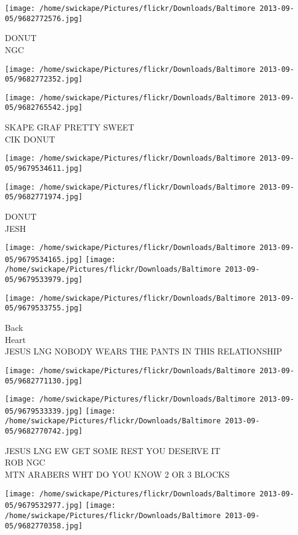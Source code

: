 \documentclass[10pt,letterpaper]{article}
\begin{document}
\vspace{0.25in}
\texttt{[image: /home/swickape/Pictures/flickr/Downloads/Baltimore 2013-09-05/9682772576.jpg]}

DONUT\\
NGC
\pagebreak

\texttt{[image: /home/swickape/Pictures/flickr/Downloads/Baltimore 2013-09-05/9682772352.jpg]}

\vspace{0.25in}
\texttt{[image: /home/swickape/Pictures/flickr/Downloads/Baltimore 2013-09-05/9682765542.jpg]}

SKAPE GRAF PRETTY SWEET\\
CIK DONUT
\pagebreak

\texttt{[image: /home/swickape/Pictures/flickr/Downloads/Baltimore 2013-09-05/9679534611.jpg]}

\vspace{0.25in}
\texttt{[image: /home/swickape/Pictures/flickr/Downloads/Baltimore 2013-09-05/9682771974.jpg]}

DONUT\\
JESH
\pagebreak

\texttt{[image: /home/swickape/Pictures/flickr/Downloads/Baltimore 2013-09-05/9679534165.jpg]}
\texttt{[image: /home/swickape/Pictures/flickr/Downloads/Baltimore 2013-09-05/9679533979.jpg]}

\texttt{[image: /home/swickape/Pictures/flickr/Downloads/Baltimore 2013-09-05/9679533755.jpg]}

Back\\
Heart\\
JESUS LNG NOBODY WEARS THE PANTS IN THIS RELATIONSHIP
\pagebreak

\texttt{[image: /home/swickape/Pictures/flickr/Downloads/Baltimore 2013-09-05/9682771130.jpg]}

\vspace{0.25in}
\texttt{[image: /home/swickape/Pictures/flickr/Downloads/Baltimore 2013-09-05/9679533339.jpg]}
\texttt{[image: /home/swickape/Pictures/flickr/Downloads/Baltimore 2013-09-05/9682770742.jpg]}

JESUS LNG EW GET SOME REST YOU DESERVE IT\\
ROB NGC\\
MTN ARABERS WHT DO YOU KNOW 2 OR 3 BLOCKS
\pagebreak

\texttt{[image: /home/swickape/Pictures/flickr/Downloads/Baltimore 2013-09-05/9679532977.jpg]}
\texttt{[image: /home/swickape/Pictures/flickr/Downloads/Baltimore 2013-09-05/9682770358.jpg]}
\end{document}
